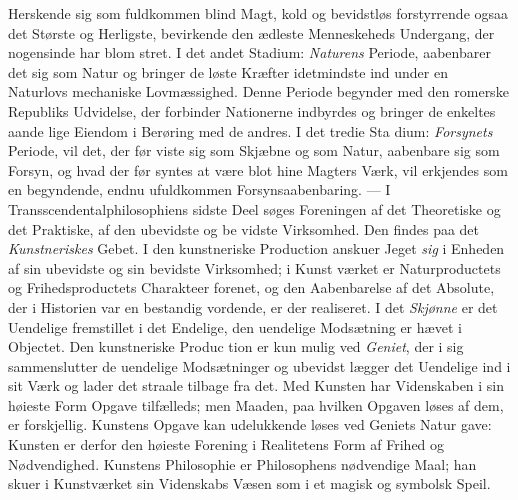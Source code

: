 \documentclass[12pt,a4paper]{book}
\begin{document}
Herskende sig som fuldkommen blind Magt, kold og bevidstløs
forstyrrende ogsaa det Største og Herligste, bevirkende den
ædleste Menneskeheds Undergang, der nogensinde har blom\-%
stret. I det andet Stadium: \emph{Naturens} Periode, aabenbarer
det sig som Natur og bringer de løste Kræfter idetmindste
ind under en Naturlovs mechaniske Lovmæssighed. Denne
Periode begynder med den romerske Republiks Udvidelse, der
forbinder Nationerne indbyrdes og bringer de enkeltes aande\-%
lige Eiendom i Berøring med de andres. I det tredie Sta\-%
dium: \emph{Forsynets} Periode, vil det, der før viste sig som
Skjæbne og som Natur, aabenbare sig som Forsyn, og hvad
der før syntes at være blot hine Magters Værk, vil erkjendes
som en begyndende, endnu ufuldkommen Forsynsaabenbaring. ---
I Transscendentalphilosophiens sidste Deel søges Foreningen
af det Theoretiske og det Praktiske, af den ubevidste og be\-%
vidste Virksomhed. Den findes paa det \emph{Kunstneriskes}
Gebet. I den kunstneriske Production anskuer Jeget \emph{sig} i
Enheden af sin ubevidste og sin bevidste Virksomhed; i Kunst\-%
værket er Naturproductets og Frihedsproductets Charakteer
forenet, og den Aabenbarelse af det Absolute, der i Historien
var en bestandig vordende, er der realiseret. I det \emph{Skjønne}
er det Uendelige fremstillet i det Endelige, den uendelige
Modsætning er hævet i Objectet. Den kunstneriske Produc\-%
tion er kun mulig ved \emph{Geniet}, der i sig sammenslutter de
uendelige Modsætninger og ubevidst lægger det Uendelige ind i
sit Værk og lader det straale tilbage fra det. Med Kunsten
har Videnskaben i sin høieste Form Opgave tilfælleds; men
Maaden, paa hvilken Opgaven løses af dem, er forskjellig.
Kunstens Opgave kan udelukkende løses ved Geniets Natur\-%
gave: Kunsten er derfor den høieste Forening i Realitetens
Form af Frihed og Nødvendighed. Kunstens Philosophie er
Philosophens nødvendige Maal; han skuer i Kunstværket sin
Videnskabs Væsen som i et magisk og symbolsk Speil.
\end{document}
